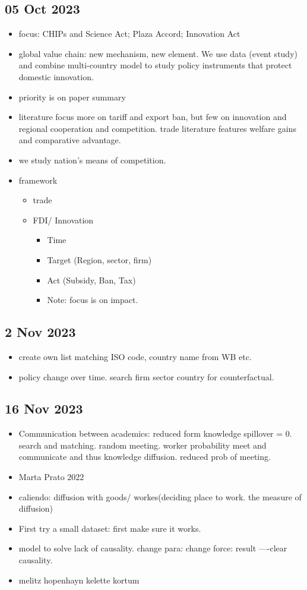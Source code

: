 	\subsection{05 Oct 2023}
		\begin{itemize}
		\item focus: CHIPs and Science Act; Plaza Accord; Innovation Act
		\item global value chain: new mechanism, new element. We use data (event study) and combine multi-country model to study policy instruments that protect domestic innovation.
		\item priority is on paper summary
		\item literature focus more on tariff and export ban, but few on innovation and regional cooperation and competition. trade literature features welfare gains and comparative advantage.
		\item we study nation's means of competition.
		\item framework
			\begin{itemize}
			\item trade
			\item FDI/ Innovation
				\begin{itemize}
				\item Time
				\item Target (Region, sector, firm)
				\item Act (Subsidy, Ban, Tax)
				\item Note: focus is on impact.
				\end{itemize}
			\end{itemize}
		\end{itemize}
	\subsection{2 Nov 2023}
		\begin{itemize}
		\item create own list matching ISO code, country name from WB etc.
		\item policy change over time. search firm sector country for counterfactual.
		\end{itemize}
	\subsection{16 Nov 2023}
		\begin{itemize}
			\item Communication between academics: reduced form knowledge spillover = 0. search and matching. random meeting. worker probability meet and communicate and thus knowledge diffusion. reduced prob of meeting.
			\item Marta Prato 2022
			\item caliendo: diffusion with goods/ workes(deciding place to work. the measure of diffusion)
			\item First try a small dataset: first make sure it works.
			\item model to solve lack of causality. change para: change force: result ----clear causality.
			\item melitz hopenhayn kelette kortum
		\end{itemize}
\newpage

\footnotesize



